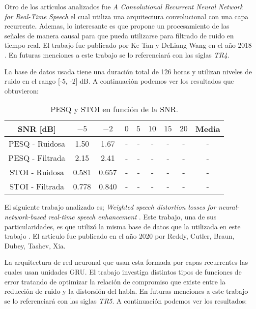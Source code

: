 Otro de los artículos analizados fue \emph{A Convolutional Recurrent Neural Network for Real-Time Speech} el cual utiliza una arquitectura convolucional con una capa recurrente. Ademas, lo interesante es que propone un procesamiento de las señales de manera causal para que pueda utilizarse para filtrado de ruido en tiempo real. El trabajo fue publicado por Ke Tan y DeLiang Wang en el año 2018 \cite{a_convolutional_recurrent_neural_network_for_real_time_speech_enhancement}.  En futuras menciones a este trabajo se lo referenciará con las siglas \emph{TR4}.

La base de datos usada tiene una duración total de 126 horas y utilizan niveles de ruido en el rango [-5, -2] dB. A continuación podemos ver los resultados que obtuvieron:

\begin{table}[H]
	\centering
	\begin{tabular}{ |c|c|c|c|c|c|c|c|c| } 
		\hline
		SNR [dB] & $-5$ & $-2$ & $0$ & $5$ & $10$ & $15$ & $20$ & Media \\ 
		\hline
		PESQ - Ruidosa & 1.50 & 1.67 & - & - & - & - & - & - \\
		PESQ - Filtrada & 2.15 & 2.41 & - & - & - & - & - & - \\
		\hline
		STOI - Ruidosa & 0.581 & 0.657 & - & - & - & - & - & - \\
		STOI - Filtrada & 0.778 & 0.840 & - & - & - & - & - & - \\
		\hline
	\end{tabular}
	\caption{PESQ y STOI en función de la SNR.}
\end{table}

El siguiente trabajo analizado es; \emph{Weighted speech distortion losses for neural-network-based real-time speech enhancement} \cite{weighted_speech_distortion_losses_for_neural_network_based_real_time_speech_enhancement}. Este trabajo, una de sus particularidades, es que utilizó la misma base de datos que la utilizada en este trabajo \cite{a_scalable_noisy_speech_dataset_and_online_subjective_test_framework}. El articulo fue publicado en el año 2020 por Reddy, Cutler, Braun, Dubey, Tashev, Xia.  

La arquitectura de red neuronal que usan esta formada por capas recurrentes las cuales usan unidades GRU. El trabajo investiga distintos tipos de funciones de error tratando de optimizar la relación de compromiso que existe entre la reducción de ruido y la distorsión del habla. En futuras menciones a este trabajo se lo referenciará con las siglas \emph{TR5}. A continuación podemos ver los resultados:

